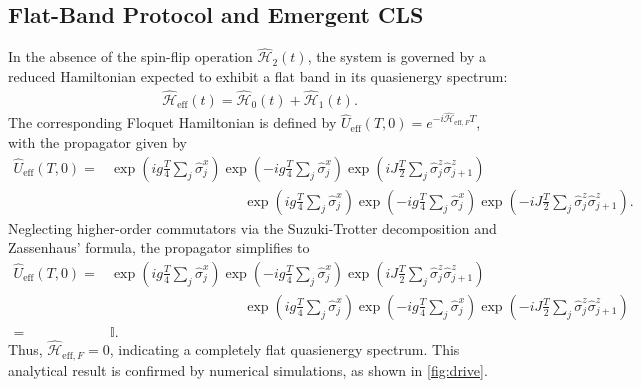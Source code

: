 \documentclass[a4paper,10pt]{article}
\begin{document}
\subsection{Flat-Band Protocol and Emergent CLS}
In the absence of the spin-flip operation $\hat{\mathcal{H}}_2(t)$, the system is governed by a reduced Hamiltonian expected to exhibit a flat band in its quasienergy spectrum:
\begin{align}
    \hat{\mathcal{H}}_{\text{eff}}(t) = \hat{\mathcal{H}}_0(t) + \hat{\mathcal{H}}_1(t).
\end{align}
The corresponding Floquet Hamiltonian is defined by $\hat{U}_{\text{eff}}(T,0) = e^{-i \hat{\mathcal{H}}_{\text{eff},F} T}$, with the propagator given by
\begin{align}
    \hat{U}_{\text{eff}}(T,0) =& 
    \exp\left(i g \frac{T}{4} \sum_{j}\hat{\sigma}_j^x\right)
    \exp\left(-i g \frac{T}{4} \sum_{j}\hat{\sigma}_j^x\right)\exp\left(i J \frac{T}{2} \sum_{j} \hat{\sigma}_j^z \hat{\sigma}_{j+1}^z\right)\nonumber\\
    &\hspace{4cm}\exp\left(i g \frac{T}{4} \sum_{j}\hat{\sigma}_j^x\right)\exp\left(-i g \frac{T}{4} \sum_{j}\hat{\sigma}_j^x\right)\exp\left(-i J \frac{T}{2} \sum_{j} \hat{\sigma}_j^z \hat{\sigma}_{j+1}^z\right).
\end{align}
Neglecting higher-order commutators via the Suzuki-Trotter decomposition and Zassenhaus’ formula, the propagator simplifies to
\begin{align}
    \hat{U}_{\text{eff}}(T,0) =& 
        \exp\left(i g \frac{T}{4} \sum_{j}\hat{\sigma}_j^x\right)
        \exp\left(-i g \frac{T}{4} \sum_{j}\hat{\sigma}_j^x\right)\exp\left(i J \frac{T}{2} \sum_{j} \hat{\sigma}_j^z \hat{\sigma}_{j+1}^z\right)\nonumber\\
        &\hspace{4cm}\exp\left(i g \frac{T}{4} \sum_{j}\hat{\sigma}_j^x\right)\exp\left(-i g \frac{T}{4} \sum_{j}\hat{\sigma}_j^x\right)\exp\left(-i J \frac{T}{2} \sum_{j} \hat{\sigma}_j^z \hat{\sigma}_{j+1}^z\right)\nonumber\\
        =& \mathbb{I}.
\end{align}
Thus, $\hat{\mathcal{H}}_{\text{eff},F} = 0$, indicating a completely flat quasienergy spectrum. This analytical result is confirmed by numerical simulations, as shown in \cref{fig:drive}.
\end{document}
